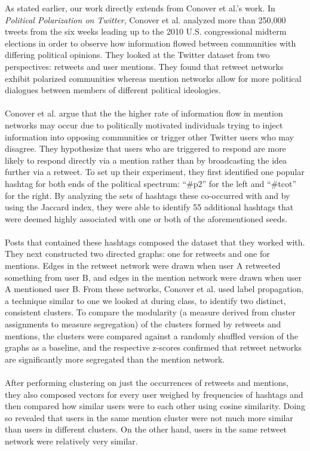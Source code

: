 \documentclass{article}
\begin{document}
As stated earlier, our work directly extends from Conover et al.'s work\cite{conover}. In \textit{Political Polarization on Twitter}, Conover et al. analyzed more than 250,000 tweets from the six weeks leading up to the 2010 U.S. congressional midterm elections in order to observe how information flowed between communities with differing political opinions. They looked at the Twitter dataset from two perspectives: retweets and user mentions. They found that retweet networks exhibit polarized communities whereas
mention networks allow for more political dialogues between members of different political ideologies.
\\\\
Conover et al. argue that the the higher rate of information flow in mention networks may occur due to politically motivated individuals trying to inject information into opposing communities or trigger other Twitter users who may disagree. They hypothesize that users who are triggered to respond are more likely to respond directly via a mention rather than by broadcasting the idea further via a retweet. To set up their experiment, they first identified one popular hashtag for both ends of the political spectrum: “#p2” for the left and “#tcot” for the right. By analyzing the sets of hashtags these co-occurred with and by using the Jaccard index, they were able to identify 55 additional hashtags that were deemed highly associated with one or both of the aforementioned seeds.
\\\\
Posts that contained these hashtags composed the dataset that they worked with. They next constructed two directed graphs: one for retweets and one for mentions. Edges in the retweet network were drawn when user A retweeted something from user B, and edges in the mention network were drawn when user A mentioned user B. From these networks, Conover et al. used label propagation, a technique similar to one we looked at during class, to identify two distinct, consistent clusters. To compare the modularity (a measure derived
from cluster assignments to measure segregation) of the clusters formed by retweets and mentions, the clusters were compared against a randomly shuffled version of the graphs as a baseline, and the respective z-scores confirmed that retweet networks are significantly more segregated than the mention network.
\\\\
After performing clustering on just the occurrences of retweets and mentions, they also composed vectors for every user weighed by frequencies of hashtags and then compared how similar users were to each other using cosine similarity. Doing so revealed that users in the same mention cluster were not much more similar than users in different clusters. On the other hand, users in the same retweet network were relatively very similar.
\end{document}
